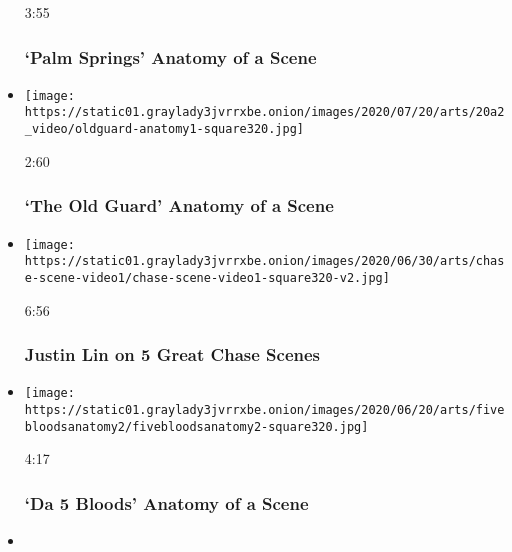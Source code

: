 \begin{itemize}
  3:55

  \hypertarget{palm-springs--anatomy-of-a-scene}{%
  \subsubsection{`Palm Springs' \textbar{} Anatomy of a
  Scene}\label{palm-springs--anatomy-of-a-scene}}
\item
  \href{https://www.nytimes3xbfgragh.onion/video/movies/100000007243014/the-old-guard-scene.html?action=click\&module=video-series-bar\&region=header\&pgtype=Article\&playlistId=video/anatomy-of-a-scene}{}

  \texttt{[image: https://static01.graylady3jvrrxbe.onion/images/2020/07/20/arts/20a2\_video/oldguard-anatomy1-square320.jpg]}

  2:60

  \hypertarget{the-old-guard--anatomy-of-a-scene}{%
  \subsubsection{`The Old Guard' \textbar{} Anatomy of a
  Scene}\label{the-old-guard--anatomy-of-a-scene}}
\item
  \href{https://www.nytimes3xbfgragh.onion/video/movies/100000007218079/great-chase-scenes.html?action=click\&module=video-series-bar\&region=header\&pgtype=Article\&playlistId=video/anatomy-of-a-scene}{}

  \texttt{[image: https://static01.graylady3jvrrxbe.onion/images/2020/06/30/arts/chase-scene-video1/chase-scene-video1-square320-v2.jpg]}

  6:56

  \hypertarget{justin-lin-on-5-great-chase-scenes}{%
  \subsubsection{Justin Lin on 5 Great Chase
  Scenes}\label{justin-lin-on-5-great-chase-scenes}}
\item
  \href{https://www.nytimes3xbfgragh.onion/video/movies/100000007198806/da-5-bloods-scene.html?action=click\&module=video-series-bar\&region=header\&pgtype=Article\&playlistId=video/anatomy-of-a-scene}{}

  \texttt{[image: https://static01.graylady3jvrrxbe.onion/images/2020/06/20/arts/fivebloodsanatomy2/fivebloodsanatomy2-square320.jpg]}

  4:17

  \hypertarget{da-5-bloods--anatomy-of-a-scene}{%
  \subsubsection{`Da 5 Bloods' \textbar{} Anatomy of a
  Scene}\label{da-5-bloods--anatomy-of-a-scene}}
\item
  \href{https://www.nytimes3xbfgragh.onion/video/movies/100000007188090/the-king-of-staten-island-scene.html?action=click\&module=video-series-bar\&region=header\&pgtype=Article\&playlistId=video/anatomy-of-a-scene}{}


\end{itemize}
